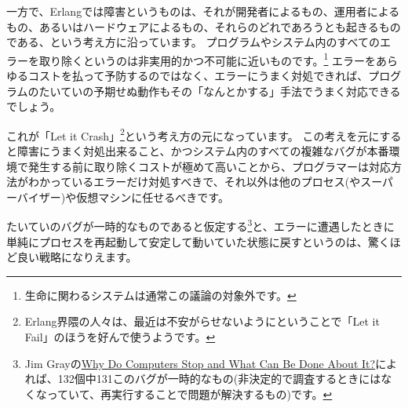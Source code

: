 一方で、Erlangでは障害というものは、それが開発者によるもの、運用者によるもの、あるいはハードウェアによるもの、それらのどれであろうとも起きるものである、という考え方に沿っています。
プログラムやシステム内のすべてのエラーを取り除くというのは非実用的かつ不可能に近いものです。\footnote{生命に関わるシステムは通常この議論の対象外です。}
エラーをあらゆるコストを払って予防するのではなく、エラーにうまく対処できれば、プログラムのたいていの予期せぬ動作もその「なんとかする」手法でうまく対応できるでしょう。

これが「Let it Crash」\footnote{Erlang界隈の人々は、最近は不安がらせないようにということで「Let it Fail」のほうを好んで使うようです。}という考え方の元になっています。
この考えを元にすると障害にうまく対処出来ること、かつシステム内のすべての複雑なバグが本番環境で発生する前に取り除くコストが極めて高いことから、プログラマーは対応方法がわかっているエラーだけ対処すべきで、それ以外は他のプロセス(やスーパーバイザー)や仮想マシンに任せるべきです。

たいていのバグが一時的なものであると仮定する\footnote{Jim Grayの\href{http://www.hpl.hp.com/techreports/tandem/TR-85.7.html}{Why Do Computers Stop and What Can Be Done About It?}によれば、132個中131このバグが一時的なもの(非決定的で調査するときにはなくなっていて、再実行することで問題が解決するもの)です。}と、エラーに遭遇したときに単純にプロセスを再起動して安定して動いていた状態に戻すというのは、驚くほど良い戦略になりえます。

